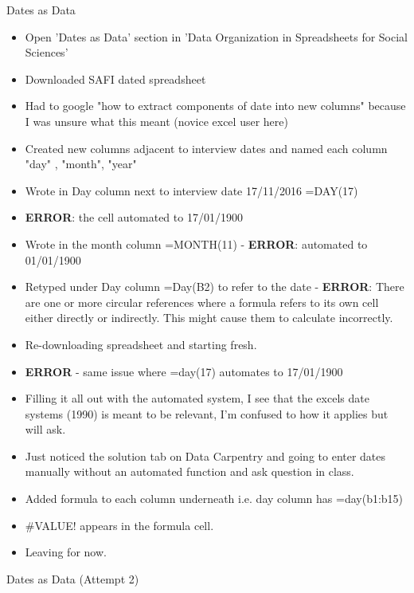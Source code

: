 \documentclass{article}
\begin{document}
Dates as Data 
\begin{itemize}
\item Open 'Dates as Data' section in 'Data Organization in Spreadsheets for Social Sciences'
\item Downloaded SAFI dated spreadsheet
\item Had to google "how to extract components of date into new columns" because I was unsure what this meant (novice excel user here)
\item Created new columns adjacent to interview dates and named each column "day" , "month", "year" 
\item Wrote in Day column next to interview date 17/11/2016 =DAY(17) 
\item \textbf{ERROR}: the cell automated to 17/01/1900
\item Wrote in the month column =MONTH(11) - \textbf{ERROR}: automated to 01/01/1900
\item Retyped under Day column =Day(B2) to refer to the date - \textbf{ERROR}: There are one or more circular references where a formula refers to its own cell either directly or indirectly. This might cause them to calculate incorrectly.
\item Re-downloading spreadsheet and starting fresh.
\item \textbf{ERROR} - same issue where =day(17) automates to 17/01/1900
\item Filling it all out with the automated system, I see that the excels date systems (1990) is meant to be relevant, I'm confused to how it applies but will ask.
\item Just noticed the solution tab on Data Carpentry and going to enter dates manually without an automated function and ask question in class.
\item Added formula to each column underneath i.e. day column has =day(b1:b15)
\item #VALUE! appears in the formula cell. 
\item Leaving for now.
\end{itemize}

Dates as Data (Attempt 2)
\end{document}
